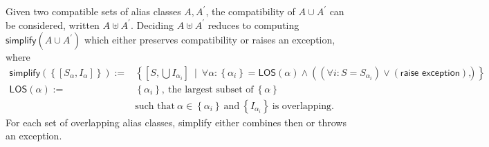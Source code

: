 \documentclass{article}
\newcommand{\tsf}{\textsf}
\newcommand{\set}[1]{\left\{ #1 \right\}}
\newcommand{\p}{^\prime}
\newcommand{\compatible}{\uplus}
\begin{document}
\noindent
Given two compatible sets of alias classes $A, A\p$, the compatibility of $A \cup A\p$ can be considered, written $A \compatible A\p$. Deciding $A \compatible A\p$ reduces to computing $\tsf{simplify}(A \cup A\p)$ which either preserves compatibility or raises an exception, where
\begin{align*}
\tsf{simplify}(\set{ [S_\alpha, I_\alpha] })
:= &
\set{
  \left[ S, \bigcup I_{\alpha_i} \right]
  \ \mid \
  \forall \alpha :
  \set{ \alpha_i } = \tsf{LOS}(\alpha)
  \land
  ((\forall i : S = S_{\alpha_i}) \lor (\tsf{raise exception}))
},
\\
\tsf{LOS}(\alpha)
:= &
\set{ \alpha_i }, \
\text{the largest subset of} \ \set{ \alpha } \\&
\text{such that} \ \alpha \in \set{ \alpha_i } \
\text{and} \ \set{ I_{\alpha_i} } \ \text{is overlapping}.
\end{align*}
For each set of overlapping alias classes, \tsf{simplify} either combines then or throws an exception.

\newpage
\end{document}
